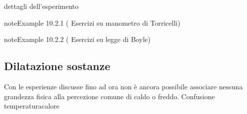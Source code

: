 \documentclass[letterpaper,10pt,italian]{jupyterBook}
\begin{document}
\sphinxAtStartPar
  dettagli dell’esperimento 
\label{ch/thermodynamics/foundation-experiments:example-0}
\begin{sphinxadmonition}{note}{Example 10.2.1 ( Esercizi su manometro di Torricelli)}


\end{sphinxadmonition}
\label{ch/thermodynamics/foundation-experiments:example-1}
\begin{sphinxadmonition}{note}{Example 10.2.2 ( Esercizi su legge di Boyle)}


\end{sphinxadmonition}


\subsection{Dilatazione sostanze}
\label{\detokenize{ch/thermodynamics/foundation-experiments:dilatazione-sostanze}}
\sphinxAtStartPar
Con le esperienze discusse fino ad ora non è ancora possibile associare nessuna grandezza fisica alla percezione comune di caldo o freddo. Confusione temperatura\sphinxhyphen{}calore  
\end{document}
